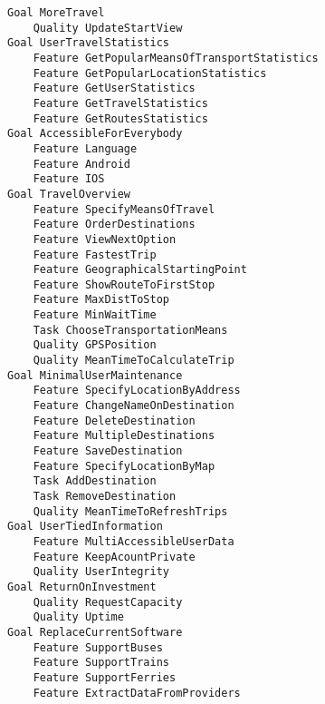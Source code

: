 

\begin{lstlisting}
Goal MoreTravel
	Quality UpdateStartView
Goal UserTravelStatistics
	Feature GetPopularMeansOfTransportStatistics
	Feature GetPopularLocationStatistics
	Feature GetUserStatistics
	Feature GetTravelStatistics
	Feature GetRoutesStatistics
Goal AccessibleForEverybody
	Feature Language
	Feature Android
	Feature IOS
Goal TravelOverview
	Feature SpecifyMeansOfTravel
	Feature OrderDestinations
	Feature ViewNextOption
	Feature FastestTrip
	Feature GeographicalStartingPoint
	Feature ShowRouteToFirstStop
	Feature MaxDistToStop
	Feature MinWaitTime
	Task ChooseTransportationMeans
	Quality GPSPosition
	Quality MeanTimeToCalculateTrip
Goal MinimalUserMaintenance
	Feature SpecifyLocationByAddress
	Feature ChangeNameOnDestination
	Feature DeleteDestination
	Feature MultipleDestinations
	Feature SaveDestination
	Feature SpecifyLocationByMap
	Task AddDestination
	Task RemoveDestination
	Quality MeanTimeToRefreshTrips
Goal UserTiedInformation
	Feature MultiAccessibleUserData
	Feature KeepAcountPrivate
	Quality UserIntegrity
Goal ReturnOnInvestment
	Quality RequestCapacity
	Quality Uptime
Goal ReplaceCurrentSoftware
	Feature SupportBuses
	Feature SupportTrains
	Feature SupportFerries
	Feature ExtractDataFromProviders

\end{lstlisting}
